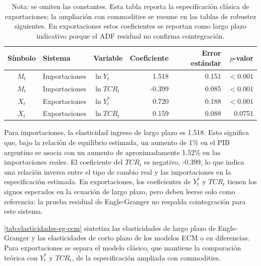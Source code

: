 \documentclass[11pt,a4paper]{article}
\begin{document}
	\begin{table}[H]
		\centering
		\caption{Coeficientes de largo plazo Engle-Granger.}
		\label{tab:coeficientes-largo-plazo-eg}
		\small
		\begin{tabular}{cllrrr}
			\toprule
			Símbolo & Sistema & Variable & Coeficiente & Error estándar & \(p\)-valor \\
			\midrule
			\(M_t\) & Importaciones & \(\ln Y_t\) & 1.518 & 0.151 & \(<0.001\) \\
			\(M_t\) & Importaciones & \(\ln TCR_t\) & -0.399 & 0.085 & \(<0.001\) \\
			\(X_t\) & Exportaciones & \(\ln Y_t^*\) & 0.720 & 0.188 & \(<0.001\) \\
			\(X_t\) & Exportaciones & \(\ln TCR_t\) & 0.159 & 0.088 & 0.0751 \\
			\bottomrule
		\end{tabular}
		\caption*{\footnotesize Nota: se omiten las constantes. Esta tabla reporta la
			especificación clásica de exportaciones; la ampliación con commodities se
			resume en las tablas de robustez siguientes. En exportaciones estos
			coeficientes se reportan como largo plazo indicativo porque el ADF residual no
			confirma cointegración.}
	\end{table}

	Para importaciones, la elasticidad ingreso de largo plazo es 1.518. Esto
	significa que, bajo la relación de equilibrio estimada, un aumento de 1\% en el
	PIB argentino se asocia con un aumento de aproximadamente 1.52\% en las
	importaciones reales. El coeficiente del \(TCR_t\) es negativo, -0.399, lo que
	indica una relación inversa entre el tipo de cambio real y las importaciones en
	la especificación estimada. En exportaciones, los coeficientes de \(Y_t^*\) y
	\(TCR_t\) tienen los signos esperados en la ecuación de largo plazo, pero deben
	leerse solo como referencia: la prueba residual de Engle-Granger no respalda
	cointegración para este sistema.

	\autoref{tab:elasticidades-eg-ecm} sintetiza las elasticidades de largo plazo
	de Engle-Granger y las elasticidades de corto plazo de los modelos ECM o en
	diferencias. Para exportaciones se separa el modelo clásico, que mantiene la
	comparación teórica con \(Y_t^*\) y \(TCR_t\), de la especificación ampliada con
	commodities.
\end{document}
